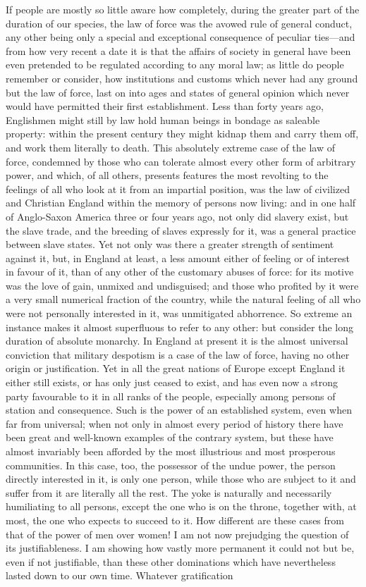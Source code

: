 \documentclass[12pt]{report}
\begin{document}
If people are mostly so little aware how completely, during the greater part of the duration of our species, the law of force was the avowed rule of general conduct, any other being only a special and exceptional consequence of peculiar ties—and from how very recent a date it is that the affairs of society in general have been even pretended to be regulated according to any moral law; as little do people remember or consider, how institutions and customs which never had any ground but the law of force, last on into ages and states of general opinion which never would have permitted their first establishment. Less than forty years ago, Englishmen might still by law hold human beings in bondage as saleable property: within the present century they might kidnap them and carry them off, and work them literally to death. This absolutely extreme case of the law of force, condemned by those who can tolerate almost every other form of arbitrary power, and which, of all others, presents features the most revolting to the feelings of all who look at it from an impartial position, was the law of civilized and Christian England within the memory of persons now living: and in one half of Anglo-Saxon America three or four years ago, not only did slavery exist, but the slave trade, and the breeding of slaves expressly for it, was a general practice between slave states. Yet not only was there a greater strength of sentiment against it, but, in England at least, a less amount either of feeling or of interest in favour of it, than of any other of the customary abuses of force: for its motive was the love of gain, unmixed and undisguised; and those who profited by it were a very small numerical fraction of the country, while the natural feeling of all who were not personally interested in it, was unmitigated abhorrence. So extreme an instance makes it almost superfluous to refer to any other: but consider the long duration of absolute monarchy. In England at present it is the almost universal conviction that military despotism is a case of the law of force, having no other origin or justification. Yet in all the great nations of Europe except England it either still exists, or has only just ceased to exist, and has even now a strong party favourable to it in all ranks of the people, especially among persons of station and consequence. Such is the power of an established system, even when far from universal; when not only in almost every period of history there have been great and well-known examples of the contrary system, but these have almost invariably been afforded by the most illustrious and most prosperous communities. In this case, too, the possessor of the undue power, the person directly interested in it, is only one person, while those who are subject to it and suffer from it are literally all the rest. The yoke is naturally and necessarily humiliating to all persons, except the one who is on the throne, together with, at most, the one who expects to succeed to it. How different are these cases from that of the power of men over women! I am not now prejudging the question of its justifiableness. I am showing how vastly more permanent it could not but be, even if not justifiable, than these other dominations which have nevertheless lasted down to our own time. Whatever gratification 
\end{document}
